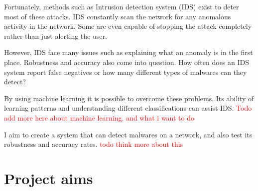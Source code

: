\documentclass[12pt]{article}
\begin{document}
Fortunately, methods such as Intrusion detection system (IDS) exist to deter most of these attacks. IDS constantly scan the network for any anomalous activity in the network. Some are even capable of stopping the attack completely rather than just alerting the user. 

However, IDS face many issues such as explaining what an anomaly is in the first place. Robustness and accuracy also come into question. How often does an IDS system report false negatives or how many different types of malwares can they detect?

By using machine learning it is possible to overcome these problems. Its ability of learning patterns and understanding different classifications can assist IDS. \textcolor{red}{Todo add more here about machine learning. and what i want to do}

I aim to create a system that can detect malwares on a network, and also test its robustness and accuracy rates. \textcolor{red}{todo think more about this}

\section{Project aims}


\newpage


\end{document}
